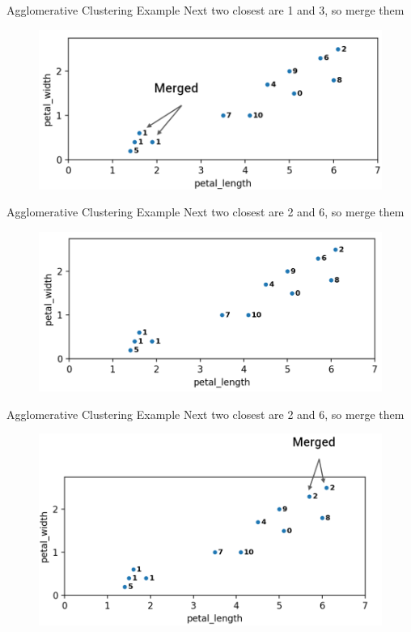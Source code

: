\documentclass[aspectratio=169]{../latex_main/tntbeamer}  %
\begin{document}
	
	\begin{frame}{Agglomerative Clustering Example}
	    Next two closest are 1 and 3, so merge them
	    \begin{figure}
	        \centering
	        \includegraphics[scale=.35]{Bild33}
	    \end{figure}
	\end{frame}
	
	
	
	\begin{frame}{Agglomerative Clustering Example}
	    Next two closest are 2 and 6, so merge them
	    \begin{figure}
	        \centering
	        \includegraphics[scale=.35]{Bild34}
	    \end{figure}
	\end{frame}
	
	
	
	\begin{frame}{Agglomerative Clustering Example}
	    Next two closest are 2 and 6, so merge them
	    \begin{figure}
	        \centering
	        \includegraphics[scale=.35]{Bild35}
	    \end{figure}
	\end{frame}
	
\end{document}
